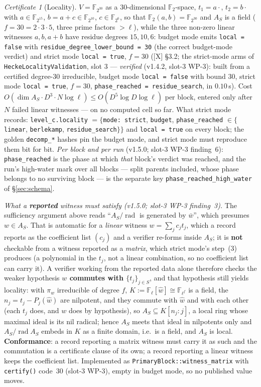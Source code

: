 \documentclass[11pt]{article}
\theoremstyle{remark}
\newtheorem{certificate}[theorem]{Certificate}
\newcommand{\F}{\mathbb{F}}
\newcommand{\Fl}{\F_\ell}
\DeclareMathOperator{\rad}{rad}
\begin{document}
\begin{certificate}[Locality]
$V=\F_{2^{30}}$ as a $30$-dimensional $\F_2$-space, $t_1=a\cdot$, $t_2=b\cdot$ with
$a\in\F_{2^{15}}$, $b=a+c\in\F_{2^{10}}$, $c\in\F_{2^6}$, so that $\F_2(a,b)=\F_{2^{30}}$ and
$A_S$ is a field ($f=30=2\cdot3\cdot5$, three prime factors $>\ell$), while the three non-zero
linear witnesses $a,b,a+b$ have residue degrees $15,10,6$: budget mode emits
\texttt{local = false} with \texttt{residue\_degree\_lower\_bound = 30} (the correct budget-mode
verdict) and strict mode \texttt{local = true}, $f=30$ ([X] \S3.2; the strict-mode arms of
\texttt{HeckeLocalityValidation}, slot 3 --- \emph{verified} (v1.4.2, slot-3 WP-3): built from
a certified degree-$30$ irreducible, budget mode \texttt{local = false} with bound $30$, strict
mode \texttt{local = true}, $f=30$, \texttt{phase\_reached = residue\_search}, in $0.10$\,s). Cost $O(\dim A_S\cdot D^3\cdot N\log\ell)\le
O(D^5\log D\log\ell)$ per block, entered only after $N$ failed linear witnesses --- on no
computed cell so far. What strict mode records: \texttt{level\_c.locality} $=\{$\texttt{mode:
strict}, \texttt{budget}, \texttt{phase\_reached} $\in\{$\texttt{linear}, \texttt{berlekamp},
\texttt{residue\_search}$\}\}$ and \texttt{local = true} on every block; the golden
\texttt{decomp\_*} hashes pin the budget mode, and strict mode must reproduce them bit for bit.
\emph{Per block and per run} (v1.5.0; slot-3 WP-3 finding~6): \texttt{phase\_reached} is the
phase at which \emph{that} block's verdict was reached, and the run's high-water mark over
all blocks --- split parents included, whose phase belongs to no surviving block --- is the
separate key \texttt{phase\_reached\_high\_water} of \S\ref{sec:schema}.

\emph{What a \textbf{reported} witness must satisfy (v1.5.0; slot-3 WP-3 finding~3).} The
sufficiency argument above reads ``$A_S/\rad$ is generated by $\bar w$'', which presumes
$w\in A_S$. That is automatic for a \emph{linear} witness $w=\sum_jc_jt_j$, which a record
reports as the coefficient list $(c_j)$ and a verifier re-forms inside $A_S$; it is
\textbf{not} checkable from a witness reported as a \emph{matrix}, which strict mode's
step~(3) produces (a polynomial in the $t_j$, not a linear combination, so no coefficient
list can carry it). A verifier working from the reported data alone therefore checks the
weaker hypothesis \textbf{$w$ commutes with $\{t_j\}_{j\in S}$}, and that hypothesis still
yields locality: with $\pi_w$ irreducible of degree $f$, $K:=\Fl[\hat w]\cong\F_{\ell^f}$
is a field, the $n_j=t_j-P_j(\hat w)$ are nilpotent, and they commute with $\hat w$ and
with each other (each $t_j$ does, and $w$ does by hypothesis), so $A_S\subseteq K[n_j:j]$,
a local ring whose maximal ideal is its nil radical; hence $A_S$ meets that ideal in
nilpotents only and $A_S/\rad A_S$ embeds in $K$ as a finite domain, i.e.\ is a field, and
$A_S$ is local. \textbf{Conformance}: a record reporting a matrix witness must carry it as
such and the commutation is a certificate clause of its own; a record reporting a linear
witness keeps the coefficient list. Implemented as \texttt{PrimaryBlock::witness\_matrix}
with \texttt{certify()} code~30 (slot-3 WP-3), empty in budget mode, so no published value
moves.


\end{certificate}
\end{document}
